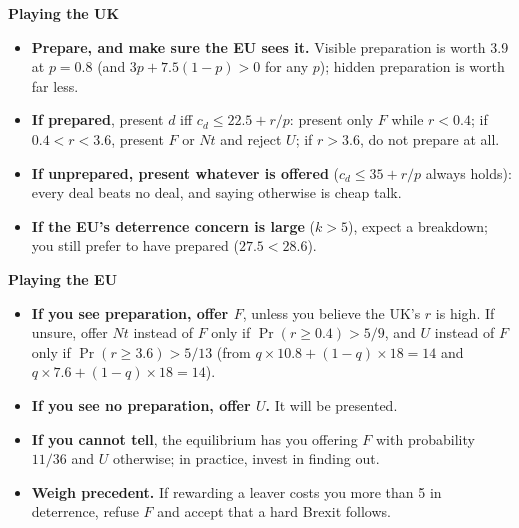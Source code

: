 \documentclass[10pt,a4paper]{article}
\newcommand{\Nt}{\mathit{Nt}}
\newcommand{\dF}{\mathit{F}}
\newcommand{\dU}{\mathit{U}}
\begin{document}
\clearpage
\begin{tcolorbox}[colback=src!4,colframe=src,boxrule=0.5pt,left=4pt,right=4pt,top=3pt,bottom=3pt,
  title={In-class decision guide (baseline numbers)}]
\small
\begin{minipage}[t]{0.485\linewidth}
\textbf{Playing the UK}
\begin{itemize}[leftmargin=1.1em]
  \item \textbf{Prepare, and make sure the EU sees it.} Visible preparation is worth 3.9 at
    $p=0.8$ (and $3p+7.5(1-p)>0$ for any $p$); hidden preparation is worth far less.
  \item \textbf{If prepared}, present $d$ iff $c_d\le22.5+r/p$: present only $\dF$ while $r<0.4$;
    if $0.4<r<3.6$, present $\dF$ or $\Nt$ and reject $\dU$; if $r>3.6$, do not prepare at all.
  \item \textbf{If unprepared, present whatever is offered} ($c_d\le35+r/p$ always holds): every
    deal beats no deal, and saying otherwise is cheap talk.
  \item \textbf{If the EU's deterrence concern is large} ($k>5$), expect a breakdown; you still
    prefer to have prepared ($27.5<28.6$).
\end{itemize}
\end{minipage}\hfill
\begin{minipage}[t]{0.485\linewidth}
\textbf{Playing the EU}
\begin{itemize}[leftmargin=1.1em]
  \item \textbf{If you see preparation, offer $\dF$}, unless you believe the UK's $r$ is high.
    If unsure, offer $\Nt$ instead of $\dF$ only if $\Pr(r\ge0.4)>5/9$, and $\dU$ instead of $\dF$
    only if $\Pr(r\ge3.6)>5/13$ (from $q\times10.8+(1-q)\times18=14$ and $q\times7.6+(1-q)\times18=14$).
  \item \textbf{If you see no preparation, offer $\dU$.} It will be presented.
  \item \textbf{If you cannot tell}, the equilibrium has you offering $\dF$ with probability
    $11/36$ and $\dU$ otherwise; in practice, invest in finding out.
  \item \textbf{Weigh precedent.} If rewarding a leaver costs you more than 5 in deterrence,
    refuse $\dF$ and accept that a hard Brexit follows.
\end{itemize}
\end{minipage}
\end{tcolorbox}
\end{document}
